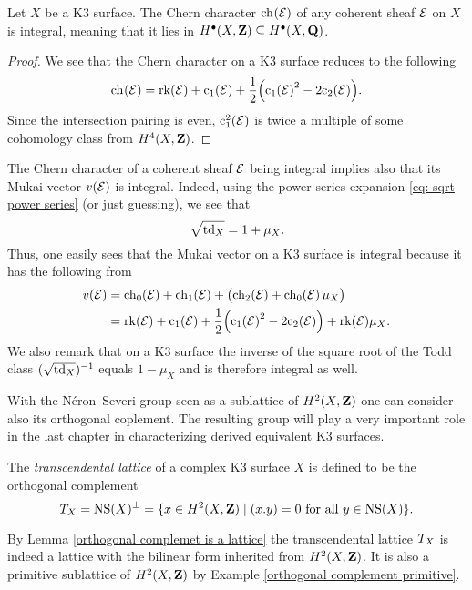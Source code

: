 \begin{corollary}
    Let $X$ be a K3 surface. The Chern character $\ch[](\E)$ of any coherent sheaf $\mathcal E$ on $X$ is integral, meaning that it lies in $H^{\bullet}(X, \mathbf Z) \subseteq H^{\bullet}(X, \mathbf Q)$.
\end{corollary}

\begin{proof}
    We see that the Chern character on a K3 surface reduces to the following
    \[
        \ch[]{\E} = \rk{\E} + \cclass[1]{\E} + \frac{1}{2}\Bigl(\cclass[1]{\E}^2 - 2\cclass[2]{\E}\Bigr).
    \]
    Since the intersection pairing is even, $\cclass[1]^2(\E)$ is twice a multiple of some cohomology class from $H^{4}(X, \mathbf Z)$.
\end{proof}

\begin{remark}
The Chern character of a coherent sheaf $\mathcal E$ being integral implies also that its Mukai vector $v(\mathcal E)$ is integral. Indeed, using the power series expansion \eqref{eq: sqrt power series} (or just guessing), we see that 
\[
    \sqrt{\operatorname{td}_{X}} = 1 + \mu_X.
\]
Thus, one easily sees that the Mukai vector on a K3 surface is integral because it has the following from
\begin{align}
    v(\E) &= \ch[0](\E) + \ch[1]{\E} + \bigl(\ch[2]{\E} + \ch[0]{\E}\mu_X\bigr)
    \notag \\
    &= \rk{\E} + \cclass[1]{\E} + \frac{1}{2}\Bigl(\cclass[1]{\E}^2 - 2\cclass[2]{\E}\Bigr) + \rk{\E}\mu_X. \notag
\end{align}
We also remark that on a K3 surface the inverse of the square root of the Todd class $(\sqrt{\operatorname{td}_{X}})^{-1}$ equals $1 - \mu_X$ and is therefore integral as well.
\end{remark}

With the Néron--Severi group seen as a sublattice of $H^{2}(X, \mathbf Z)$ one can consider also its orthogonal coplement. The resulting group will play a very important role in the last chapter in characterizing derived equivalent K3 surfaces. 

\begin{definition}
    The \emph{transcendental lattice} of a complex K3 surface $X$ is defined to be the orthogonal complement
    \[
        T_{X} = \operatorname{NS}(X)^\perp = \{ x \in H^{2}(X, \mathbf Z) \mid (x.y) = 0 \text{ for all $y \in \operatorname{NS}(X)$}\}.
    \]
\end{definition}

\begin{remark}
    By Lemma \ref{orthogonal complemet is a lattice} the transcendental lattice $T_{X}$ is indeed a lattice with the bilinear form inherited from $H^{2}(X, \mathbf Z)$. It is also a primitive sublattice of $H^{2}(X, \mathbf Z)$ by Example \ref{orthogonal complement primitive}.
\end{remark}

